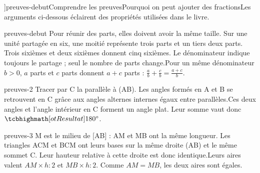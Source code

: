 \editionPage[\pdfbookmark[0]{Démonstrations}{bm-preuves-debut-parent}]{preuves-debut}{Comprendre les preuves}{Pourquoi on peut ajouter des fractions}{Les arguments ci-dessous éclairent des propriétés utilisées dans le livre.}
\begin{blocEdition}{preuves-debut}
Pour réunir des parts, elles doivent avoir la même taille. Sur une unité partagée en six, une moitié représente trois parts et un tiers deux parts.\label{fig-preuves-debut-cours-somme-fractions}
Trois sixièmes et deux sixièmes donnent cinq sixièmes. Le dénominateur indique toujours le partage ; seul le nombre de parts change.Pour un même dénominateur $b>0$, $a$ parts et $c$ parts donnent $a+c$ parts : $\frac ab+\frac cb=\frac{a+c}b$.
\end{blocEdition}
\begin{blocEdition}{preuves-2}
Tracer par C la parallèle à (AB).\label{fig-preuves-2-cours-triangle-angles}
Les angles formés en A et B se retrouvent en C grâce aux angles alternes internes égaux entre parallèles.Ces deux angles et l’angle intérieur en C forment un angle plat. Leur somme vaut donc $\res{180^\circ}$.
\end{blocEdition}
\begin{blocEdition}{preuves-3}
M est le milieu de [AB] : AM et MB ont la même longueur.\label{fig-preuves-3-cours-mediane}
Les triangles ACM et BCM ont leurs bases sur la même droite (AB) et le même sommet C. Leur hauteur relative à cette droite est donc identique.Leurs aires valent $AM\times h:2$ et $MB\times h:2$. Comme $AM=MB$, les deux aires sont égales.
\end{blocEdition}

